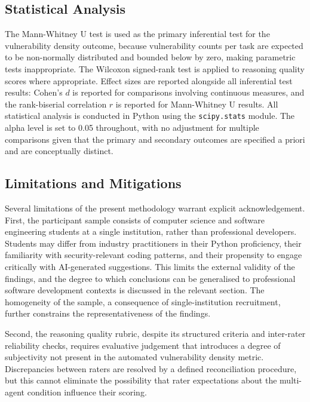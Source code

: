 \subsection{Statistical Analysis}

The Mann-Whitney U test is used as the primary inferential test for the vulnerability density outcome, because vulnerability counts per task are expected to be non-normally distributed and bounded below by zero, making parametric tests inappropriate. The Wilcoxon signed-rank test is applied to reasoning quality scores where appropriate. Effect sizes are reported alongside all inferential test results: Cohen's $d$ is reported for comparisons involving continuous measures, and the rank-biserial correlation $r$ is reported for Mann-Whitney U results. All statistical analysis is conducted in Python using the \texttt{scipy.stats} module. The alpha level is set to 0.05 throughout, with no adjustment for multiple comparisons given that the primary and secondary outcomes are specified a priori and are conceptually distinct.

\subsection{Limitations and Mitigations}

Several limitations of the present methodology warrant explicit acknowledgement. First, the participant sample consists of computer science and software engineering students at a single institution, rather than professional developers. Students may differ from industry practitioners in their Python proficiency, their familiarity with security-relevant coding patterns, and their propensity to engage critically with AI-generated suggestions. This limits the external validity of the findings, and the degree to which conclusions can be generalised to professional software development contexts is discussed in the relevant section. The homogeneity of the sample, a consequence of single-institution recruitment, further constrains the representativeness of the findings.

Second, the reasoning quality rubric, despite its structured criteria and inter-rater reliability checks, requires evaluative judgement that introduces a degree of subjectivity not present in the automated vulnerability density metric. Discrepancies between raters are resolved by a defined reconciliation procedure, but this cannot eliminate the possibility that rater expectations about the multi-agent condition influence their scoring.

